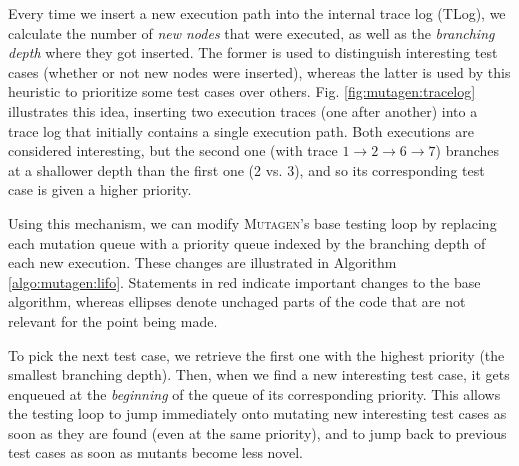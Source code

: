\documentclass[sigconf,review,anonymous]{acmart}
\newcommand{\mutagen}{\textsc{Mutagen}\xspace}
\begin{document}
Every time we insert a new execution path into the internal trace log (TLog), we
calculate the number of \emph{new nodes} that were executed, as well as the
\emph{branching depth} where they got inserted.
%
The former is used to distinguish interesting test cases (whether or not new
nodes were inserted), whereas the latter is used by this heuristic to prioritize
some test cases over others.
%
Fig. \ref{fig:mutagen:tracelog} illustrates this idea, inserting two execution
traces (one after another) into a trace log that initially contains a single
execution path.
%
Both executions are considered interesting, but the second one (with trace $1
\rightarrow 2 \rightarrow 6 \rightarrow 7$) branches at a shallower depth than
the first one (2 vs. 3), and so its corresponding test case is given a higher
priority.


Using this mechanism, we can modify \mutagen's base testing loop by replacing
each mutation queue with a priority queue indexed by the branching depth of each
new execution.
%
These changes are illustrated in Algorithm \ref{algo:mutagen:lifo}.
%
Statements in {\color{red} red} indicate important changes to the base
algorithm, whereas ellipses denote unchaged parts of the code that are not
relevant for the point being made.


To pick the next test case, we retrieve the first one with the highest priority
(the smallest branching depth).
%
Then, when we find a new interesting test case, it gets enqueued at the
\emph{beginning} of the queue of its corresponding priority.
%
This allows the testing loop to jump immediately onto mutating new interesting
test cases as soon as they are found (even at the same priority), and to jump
back to previous test cases as soon as mutants become less novel.

\end{document}
